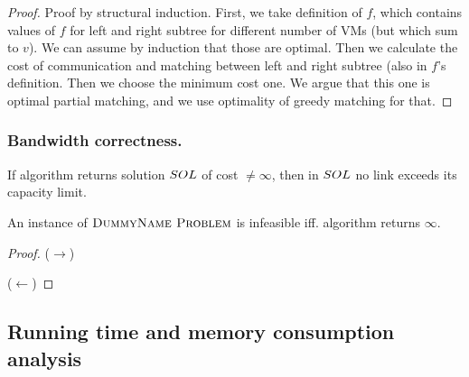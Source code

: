 \begin{proof}
Proof by structural induction. First, we take definition of $f$, which contains values of $f$ for left and right subtree for different number of VMs (but which sum to $v$). We can assume by induction that those are optimal. Then we calculate the cost of communication and matching between left and right subtree (also in $f$'s definition. Then we choose the minimum cost one. We argue that this one is optimal partial matching, and we use optimality of greedy matching for that.
\end{proof}

\subsubsection{Bandwidth correctness.}

\begin{lemma}
  If algorithm returns solution $SOL$ of cost $\neq \infty$, then in $SOL$ no link exceeds its capacity limit.
  \end{lemma}

\begin{lemma}
An instance of $\textsc{DummyName Problem}$ is infeasible iff. algorithm returns $\infty$.
\end{lemma}
\begin{proof}
  ($\rightarrow$)

  ($\leftarrow$)
  \end{proof}


\subsection{Running time and memory consumption analysis}
